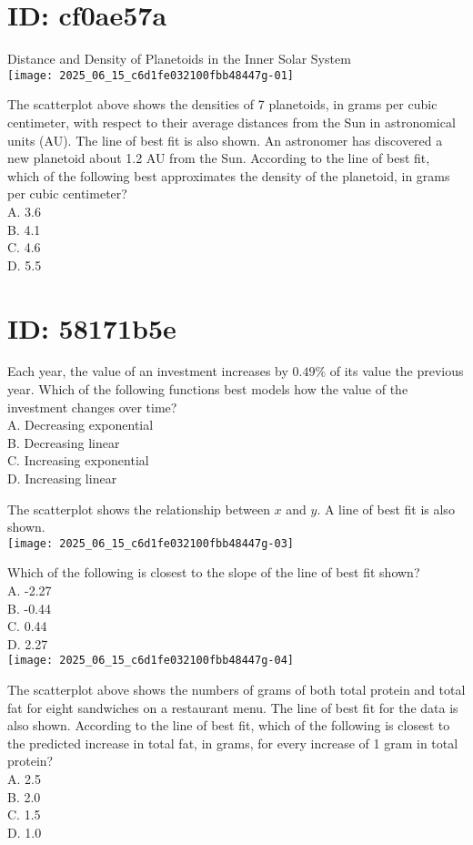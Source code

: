 




\section*{ID: cf0ae57a}
Distance and Density of Planetoids in the Inner Solar System\\
\texttt{[image: 2025\_06\_15\_c6d1fe032100fbb48447g-01]}

The scatterplot above shows the densities of 7 planetoids, in grams per cubic centimeter, with respect to their average distances from the Sun in astronomical units (AU). The line of best fit is also shown. An astronomer has discovered a new planetoid about 1.2 AU from the Sun. According to the line of best fit, which of the following best approximates the density of the planetoid, in grams per cubic centimeter?\\
A. 3.6\\
B. 4.1\\
C. 4.6\\
D. 5.5

\section*{ID: 58171b5e}
Each year, the value of an investment increases by $0.49 \%$ of its value the previous year. Which of the following functions best models how the value of the investment changes over time?\\
A. Decreasing exponential\\
B. Decreasing linear\\
C. Increasing exponential\\
D. Increasing linear

The scatterplot shows the relationship between $x$ and $y$. A line of best fit is also shown.\\
\texttt{[image: 2025\_06\_15\_c6d1fe032100fbb48447g-03]}

Which of the following is closest to the slope of the line of best fit shown?\\
A. -2.27\\
B. -0.44\\
C. 0.44\\
D. 2.27\\
\texttt{[image: 2025\_06\_15\_c6d1fe032100fbb48447g-04]}

The scatterplot above shows the numbers of grams of both total protein and total fat for eight sandwiches on a restaurant menu. The line of best fit for the data is also shown. According to the line of best fit, which of the following is closest to the predicted increase in total fat, in grams, for every increase of 1 gram in total protein?\\
A. 2.5\\
B. 2.0\\
C. 1.5\\
D. 1.0

